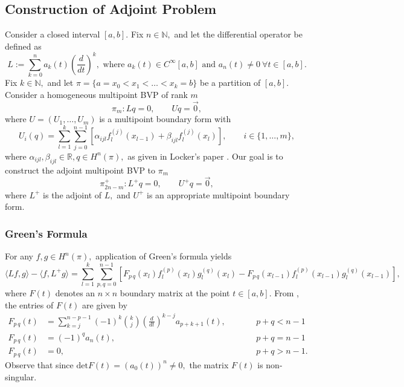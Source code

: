 \documentclass[11pt,reqno,oneside,a4paper]{article}
\theoremstyle{plain} %
\theoremstyle{definition}
\theoremstyle{remark}
\begin{document}
	
\subsection*{Construction of Adjoint Problem}
Consider a closed interval $[a,b].$ Fix $n\in\mathbb{N},$ and let the differential operator be defined as
\[ 
L  := \sum^n_{k=0} a_k(t)\left( \frac{d}{dt}\right)^k, \mbox{ where } a_k(t) \in C^{\infty}[a,b] \mbox{ and } a_n(t) \neq 0~ \forall t \in [a,b].
\]
Fix $k \in \mathbb{N},$ and let $\pi = \{ a = x_0 < x_1 < \ldots < x_k = b\}$ be a partition of $[a,b].$ Consider a homogeneous multipoint BVP of rank $m$
\[ \pi_m: Lq = 0, \qquad Uq = \vec{0},\]
where $U = (U_1, \ldots, U_m)$ is a multipoint boundary form with 
\[ 
U_i(q) = \sum^{k}_{l=1} \sum^{n-1}_{j=0}[\alpha_{ijl} f_l^{(j)}(x_{l-1}) + \beta_{ijl} f_l^{(j)}(x_{l})], \qquad i \in \{ 1, \ldots, m \}, 
\]
where $\alpha_{ijl}, \beta_{ijl} \in \mathbb{R}, q \in H^n(\pi),$ as given in Locker's paper \cite{locker}.
Our goal is to construct the adjoint multipoint BVP to $\pi_m$
\[ 
\pi^+_{2n-m}: L^+ q = 0, \qquad U^+q = \vec{0},
\] 
where $L^+$ is the adjoint of $L,$ and $U^+$ is an appropriate multipoint boundary form.
\subsubsection*{Green's Formula}
For any $f,g \in H^n(\pi),$ application of Green's formula yields
\[ \langle Lf,g\rangle - \langle f,L^+ g\rangle = \sum_{l=1}^{k}\sum_{p,q=0}^{n-1}[F_{p\,q}(x_l) f_l^{(p)}(x_l)g_l^{(q)}(x_l) - F_{p\,q}(x_{l-1})f_l^{(p)}(x_{l-1})g_l^{(q)}(x_{l-1})], \]
where $F(t)$ denotes an $n\times n$ boundary matrix at the point $t \in [a,b].$ From \cite[p. 1286]{dunford}, the entries of $F(t)$ are given by
\begin{equation*}
\begin{aligned}
F_{p\,q}(t) &= \sum^{n-p-1}_{k = j} (-1)^k \binom{k}{j} \left( \frac{d}{dt}\right)^{k-j} a_{p+k+1}(t), &&\qquad p + q< n - 1\\
F_{p\,q}(t) &= (-1)^q  a_{n}(t), &&\qquad p + q= n - 1\\
F_{p\,q}(t) &= 0, &&\qquad p + q > n - 1.
\end{aligned}
\end{equation*}
Observe that since $\mathrm{det}F(t) = (a_0(t))^n \neq 0,$ the matrix $F(t)$ is non-singular. 
\end{document}
